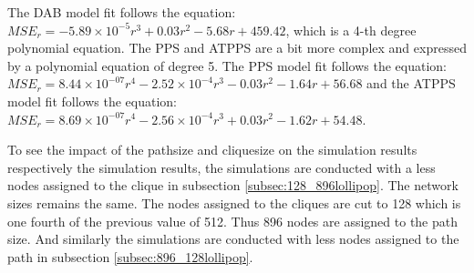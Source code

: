 The DAB model fit follows the equation: $MSE_r=-5.89\times10^{-5}r^{3}+0.03r^{2}-5.68r+459.42$, which is a 4-th degree polynomial equation. The PPS and ATPPS are a bit more complex and expressed by a polynomial equation of degree 5. The PPS model fit follows the equation: $MSE_r=8.44\times 10^{-07}r^{4}-2.52\times 10^{-4}r^{3}-0.03r^{2}-1.64r+56.68$ and the ATPPS model fit follows the equation: $MSE_r=8.69 \times 10^{-07}r^{4}-2.56 \times 10^{-4}r^{3}+0.03r^{2}-1.62r+54.48$.

%
%
%
%

To see the impact of the pathsize and cliquesize on the simulation results respectively the simulation results, the simulations are conducted with a less nodes assigned to the clique in subsection \ref{subsec:128_896lollipop}. The network sizes remains the same. The nodes assigned to the cliques are cut to 128 which is one fourth of the previous value of 512. Thus 896 nodes are assigned to the path size. And similarly the simulations are conducted with less nodes assigned to the path in subsection \ref{subsec:896_128lollipop}.  

